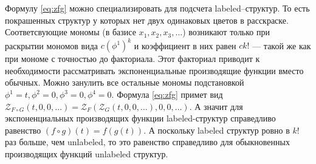 Формулу \ref{eq:zfg} можно специализировать для подсчета labeled--структур. То
есть покрашенных структур у которых нет двух одинаковых цветов в расскраске.
Соответсвующие мономы (в базисе $x_1, x_2, x_3, \dots$) возникают только при
раскрытии мономов вида $c(\phi^1)^k$ и коэффициент в них равен $ck!$ --- такой
же как при мономе с точностью до факториала. Этот факториал приводит к
необходимости рассматривать экспоненциальные производящие функции вместо
обычных. Можно занулить все остальные мономы подстановкой $\phi^1 = t, \phi^2 =
0, \phi^3 = 0, \phi^4 = 0$. Формула \ref{eq:zfg} примет вид $
\mathcal Z_{F \circ G} (t, 0, 0, \dots) =
	\mathcal Z_F(
		\mathcal Z_G(t, 0, 0, \dots), 0, 0, \dots
	)
$.
А значит для экспоненциальных производящих функции labeled-структур справедливо
равенство $(f \circ g) (t) = f(g(t))$.
А поскольку labeled структур ровно в $k!$ раз больше, чем unlabeled, то это
равенство справедливо для обыкновенных производящих функций unlabeled структур.

